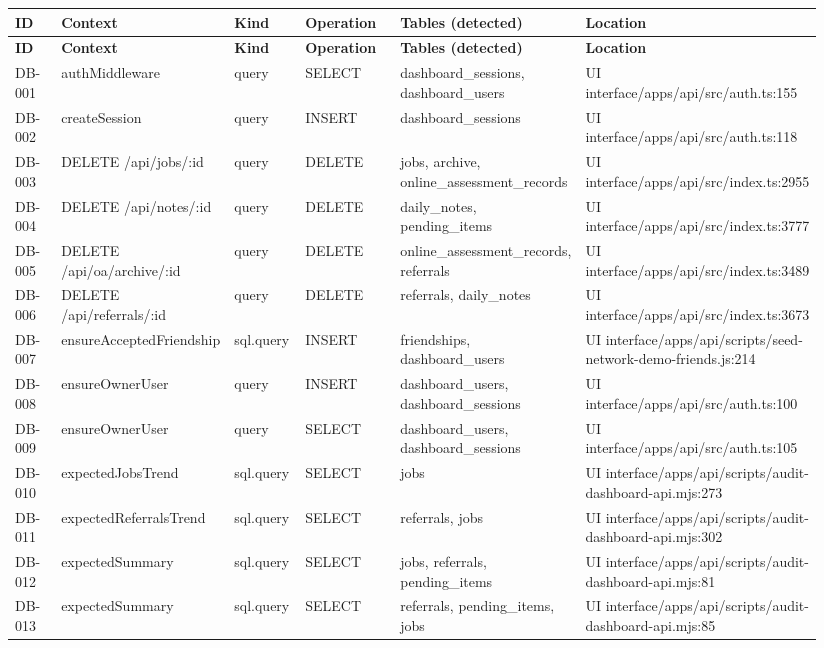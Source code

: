 \documentclass[11pt]{article}
\begin{document}
\begin{longtable}{p{0.10\linewidth}p{0.19\linewidth}p{0.10\linewidth}p{0.18\linewidth}p{0.16\linewidth}p{0.21\linewidth}}
\toprule
\textbf{ID} & \textbf{Context} & \textbf{Kind} & \textbf{Operation} & \textbf{Tables (detected)} & \textbf{Location} \\
\midrule
\endfirsthead
\toprule
\textbf{ID} & \textbf{Context} & \textbf{Kind} & \textbf{Operation} & \textbf{Tables (detected)} & \textbf{Location} \\
\midrule
\endhead
DB-001 & authMiddleware & query & SELECT & dashboard\_sessions, dashboard\_users & UI interface/apps/api/src/auth.ts:155 \\
DB-002 & createSession & query & INSERT & dashboard\_sessions & UI interface/apps/api/src/auth.ts:118 \\
DB-003 & DELETE /api/jobs/:id & query & DELETE & jobs, archive, online\_assessment\_records & UI interface/apps/api/src/index.ts:2955 \\
DB-004 & DELETE /api/notes/:id & query & DELETE & daily\_notes, pending\_items & UI interface/apps/api/src/index.ts:3777 \\
DB-005 & DELETE /api/oa/archive/:id & query & DELETE & online\_assessment\_records, referrals & UI interface/apps/api/src/index.ts:3489 \\
DB-006 & DELETE /api/referrals/:id & query & DELETE & referrals, daily\_notes & UI interface/apps/api/src/index.ts:3673 \\
DB-007 & ensureAcceptedFriendship & sql.query & INSERT & friendships, dashboard\_users & UI interface/apps/api/scripts/seed-network-demo-friends.js:214 \\
DB-008 & ensureOwnerUser & query & INSERT & dashboard\_users, dashboard\_sessions & UI interface/apps/api/src/auth.ts:100 \\
DB-009 & ensureOwnerUser & query & SELECT & dashboard\_users, dashboard\_sessions & UI interface/apps/api/src/auth.ts:105 \\
DB-010 & expectedJobsTrend & sql.query & SELECT & jobs & UI interface/apps/api/scripts/audit-dashboard-api.mjs:273 \\
DB-011 & expectedReferralsTrend & sql.query & SELECT & referrals, jobs & UI interface/apps/api/scripts/audit-dashboard-api.mjs:302 \\
DB-012 & expectedSummary & sql.query & SELECT & jobs, referrals, pending\_items & UI interface/apps/api/scripts/audit-dashboard-api.mjs:81 \\
DB-013 & expectedSummary & sql.query & SELECT & referrals, pending\_items, jobs & UI interface/apps/api/scripts/audit-dashboard-api.mjs:85 \\

\end{longtable}
\end{document}
